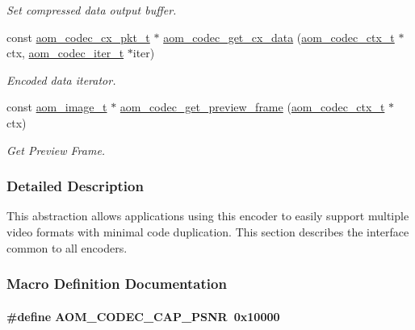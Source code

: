 \begin{DoxyCompactItemize}
\begin{DoxyCompactList}\small\item\em Set compressed data output buffer. \end{DoxyCompactList}\item 
const \hyperlink{group__encoder_ga2373bdec1f53ddb0736c53a5ebce7b7b}{aom\+\_\+codec\+\_\+cx\+\_\+pkt\+\_\+t} $\ast$ \hyperlink{group__encoder_gaedc4c56b60d4217677cb561066360884}{aom\+\_\+codec\+\_\+get\+\_\+cx\+\_\+data} (\hyperlink{group__codec_ga9a1d27f9742d9f70783e3c6cb849b5b4}{aom\+\_\+codec\+\_\+ctx\+\_\+t} $\ast$ctx, \hyperlink{group__codec_gadf9e173c9e02788a9999399edab20a02}{aom\+\_\+codec\+\_\+iter\+\_\+t} $\ast$iter)
\begin{DoxyCompactList}\small\item\em Encoded data iterator. \end{DoxyCompactList}\item 
const \hyperlink{aom__image_8h_a5409ae8fdb326fe1cc32622ef4e23748}{aom\+\_\+image\+\_\+t} $\ast$ \hyperlink{group__encoder_gadc3c2f483a71123d760552ef2593e0e5}{aom\+\_\+codec\+\_\+get\+\_\+preview\+\_\+frame} (\hyperlink{group__codec_ga9a1d27f9742d9f70783e3c6cb849b5b4}{aom\+\_\+codec\+\_\+ctx\+\_\+t} $\ast$ctx)
\begin{DoxyCompactList}\small\item\em Get Preview Frame. \end{DoxyCompactList}\end{DoxyCompactItemize}


\subsubsection{Detailed Description}
This abstraction allows applications using this encoder to easily support multiple video formats with minimal code duplication. This section describes the interface common to all encoders. 

\subsubsection{Macro Definition Documentation}
\paragraph[{\texorpdfstring{A\+O\+M\+\_\+\+C\+O\+D\+E\+C\+\_\+\+C\+A\+P\+\_\+\+P\+S\+NR}{AOM_CODEC_CAP_PSNR}}]{\setlength{\rightskip}{0pt plus 5cm}\#define A\+O\+M\+\_\+\+C\+O\+D\+E\+C\+\_\+\+C\+A\+P\+\_\+\+P\+S\+NR~0x10000}\hypertarget{group__encoder_gaaf72058c11fcf006c41662114997e12c}{}\label{group__encoder_gaaf72058c11fcf006c41662114997e12c}


